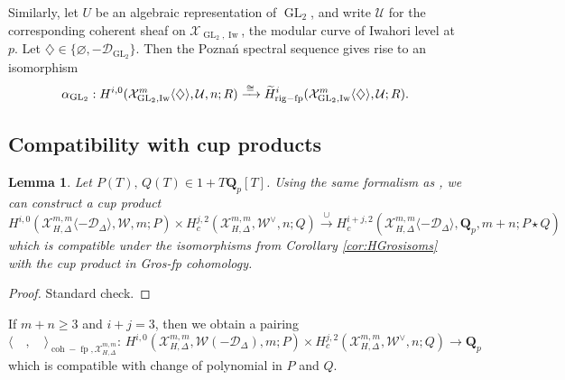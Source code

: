 \documentclass[cjm]{ipart}
\theoremstyle{plain}
\newtheorem{lemma}[theorem]{Lemma}
\theoremstyle{remark}
\DeclareMathOperator{\coh}{coh}
\DeclareMathOperator{\fp}{fp}
\DeclareMathOperator{\GL}{GL}
\DeclareMathOperator{\Iw}{Iw}
\DeclareMathOperator{\rigfp}{rig-fp}
\newcommand{\QQ}{\mathbf{Q}}
\newcommand{\Qp}{\QQ_p}
\newcommand{\cD}{\mathcal{D}}
\newcommand{\cU}{\mathcal{U}}
\newcommand{\cW}{\mathcal{W}}
\newcommand{\cX}{\mathcal{X}}
\newcommand{\wH}{\widetilde{H}}
\numberwithin{equation}{subsection}
\renewcommand{\geq}{\geqslant}
\begin{document}
  \begin{note}\label{rem:PoznanisoGL2}
   Similarly, let $U$ be an algebraic representation of $\GL_2$, and write $\cU$ for the corresponding coherent sheaf on $\cX_{\GL_2, \Iw}$, the modular curve of Iwahori level at $p$. Let $\diamondsuit\in\{\varnothing,-\cD_{\GL_2}\}$. Then the Pozna\'n spectral sequence gives rise to an isomorphism
   \begin{equation}\label{eq:GL2iso}
    \alpha_{\GL_2}: H^{i,0}(\cX^{m}_{\GL_2,\Iw}\langle\diamondsuit\rangle, \cU, n;R) \xrightarrow{\,\cong\,} \wH^i_{\rigfp}(\cX^{m}_{\GL_2,\Iw}\langle \diamondsuit\rangle, \cU;R) .\qedhere
   \end{equation}
  \end{note}


 \subsection{Compatibility with cup products} \label{ssec:Bessercup}

  \begin{lemma}\label{lem:compcup}
   Let $P(T),\, Q(T)\in 1+T\Qp[T]$. Using the same formalism as \cite[\S 2]{besser12}, we can construct a cup product
   \[ H^{i,0}(\cX^{m,m}_{H,\Delta}\langle-\cD_\Delta\rangle, \cW, m;P)\times H_c^{j,2}(\cX^{m,m}_{H,\Delta}, \cW^\vee, n;Q)\xrightarrow{\  \cup \ } H_c^{i+j,2}(\cX^{m,m}_{H,\Delta}\langle-\cD_\Delta\rangle, \Qp, m+n;P \star Q)\]
   which is compatible under the isomorphisms from Corollary \ref{cor:HGrosisoms} with the cup product in Gros-fp cohomology.
  \end{lemma}
  \begin{proof}
   Standard check.
  \end{proof}

  \begin{note}
   If $m+n\geq 3$ and $i+j=3$, then we obtain a pairing
   \begin{equation}\label{eq:cohpairing}
    \langle\quad,\quad\rangle_{\coh-\fp, \cX^{m,m}_{H,\Delta}}:\, H^{i,0}(\cX^{m,m}_{H,\Delta}, \cW(-\cD_\Delta), m;P)\times H_c^{j,2}(\cX^{m,m}_{H,\Delta}, \cW^\vee, n;Q) \longrightarrow \Qp
   \end{equation}
   which is compatible with change of polynomial in $P$ and $Q$.
  \end{note}

\end{document}
